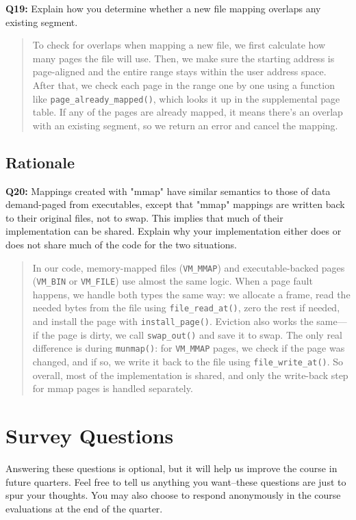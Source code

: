 \documentclass[a4paper,11pt]{paper}
\begin{document}
\textbf{Q19:} Explain how you determine whether a new file mapping overlaps any existing segment.
\begin{quote}
To check for overlaps when mapping a new file, we first calculate how many pages the file will use. Then, we make sure the starting address is page-aligned and the entire range stays within the user address space. After that, we check each page in the range one by one using a function like \texttt{page\_already\_mapped()}, which looks it up in the supplemental page table. If any of the pages are already mapped, it means there’s an overlap with an existing segment, so we return an error and cancel the mapping.
\end{quote}


\subsection{Rationale}
\textbf{Q20:} Mappings created with "mmap" have similar semantics to those of data demand-paged from executables, except that "mmap" mappings are written back to their original files, not to swap.  This implies that much of their implementation can be shared.  Explain why your implementation either does or does not share much of the code for the two situations.

\begin{quote}
In our code, memory-mapped files (\texttt{VM\_MMAP}) and executable-backed pages (\texttt{VM\_BIN} or \texttt{VM\_FILE}) use almost the same logic. When a page fault happens, we handle both types the same way: we allocate a frame, read the needed bytes from the file using \texttt{file\_read\_at()}, zero the rest if needed, and install the page with \texttt{install\_page()}. Eviction also works the same—if the page is dirty, we call \texttt{swap\_out()} and save it to swap. The only real difference is during \texttt{munmap()}: for \texttt{VM\_MMAP} pages, we check if the page was changed, and if so, we write it back to the file using \texttt{file\_write\_at()}. So overall, most of the implementation is shared, and only the write-back step for mmap pages is handled separately.
\end{quote}




\section{Survey Questions}

Answering these questions is optional, but it will help us improve the course in future quarters.  Feel free to tell us anything you want--these questions are just to spur your thoughts.  You may also choose to respond anonymously in the course evaluations at the end of the quarter.
\end{document}
